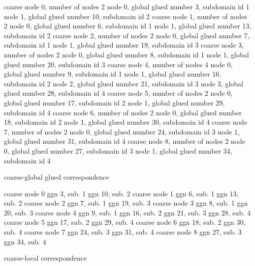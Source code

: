  coarse node      0, number of nodes  2   node 0, global glued number      3, subdomain id    1   node 1, global glued number     10, subdomain id    2
 coarse node      1, number of nodes  2   node 0, global glued number      6, subdomain id    1   node 1, global glued number     13, subdomain id    2
 coarse node      2, number of nodes  2   node 0, global glued number      7, subdomain id    1   node 1, global glued number     19, subdomain id    3
 coarse node      3, number of nodes  2   node 0, global glued number      8, subdomain id    1   node 1, global glued number     20, subdomain id    3
 coarse node      4, number of nodes  4   node 0, global glued number      9, subdomain id    1   node 1, global glued number     16, subdomain id    2   node 2, global glued number     21, subdomain id    3   node 3, global glued number     28, subdomain id    4
 coarse node      5, number of nodes  2   node 0, global glued number     17, subdomain id    2   node 1, global glued number     29, subdomain id    4
 coarse node      6, number of nodes  2   node 0, global glued number     18, subdomain id    2   node 1, global glued number     30, subdomain id    4
 coarse node      7, number of nodes  2   node 0, global glued number     24, subdomain id    3   node 1, global glued number     31, subdomain id    4
 coarse node      8, number of nodes  2   node 0, global glued number     27, subdomain id    3   node 1, global glued number     34, subdomain id    4


 coarse-global glued correspondence 

 coarse node      0   ggn      3, sub.   1   ggn     10, sub.   2
 coarse node      1   ggn      6, sub.   1   ggn     13, sub.   2
 coarse node      2   ggn      7, sub.   1   ggn     19, sub.   3
 coarse node      3   ggn      8, sub.   1   ggn     20, sub.   3
 coarse node      4   ggn      9, sub.   1   ggn     16, sub.   2   ggn     21, sub.   3   ggn     28, sub.   4
 coarse node      5   ggn     17, sub.   2   ggn     29, sub.   4
 coarse node      6   ggn     18, sub.   2   ggn     30, sub.   4
 coarse node      7   ggn     24, sub.   3   ggn     31, sub.   4
 coarse node      8   ggn     27, sub.   3   ggn     34, sub.   4


 coarse-local correspondence 

